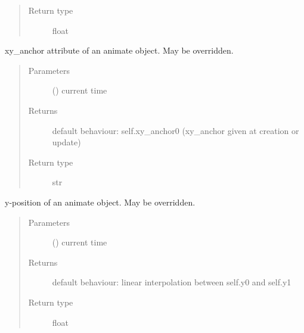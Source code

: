 \documentclass[letterpaper,10pt,english]{sphinxmanual}
\begin{document}
\begin{fulllineitems}
\begin{fulllineitems}
\begin{quote}
\begin{description}
\item[{Return type}] \leavevmode
float

\end{description}\end{quote}

\end{fulllineitems}


\begin{fulllineitems}
\label{\detokenize{Reference:salabim.Animate.xy_anchor}}
xy\_anchor attribute of an animate object. May be overridden.
\begin{quote}\begin{description}
\item[{Parameters}] \leavevmode
{} () \textendash{} current time

\item[{Returns}] \leavevmode
{} \textendash{} default behaviour: self.xy\_anchor0 (xy\_anchor given at creation or update)

\item[{Return type}] \leavevmode
str

\end{description}\end{quote}

\end{fulllineitems}


\begin{fulllineitems}
\label{\detokenize{Reference:salabim.Animate.y}}
y-position of an animate object. May be overridden.
\begin{quote}\begin{description}
\item[{Parameters}] \leavevmode
{} () \textendash{} current time

\item[{Returns}] \leavevmode
{} \textendash{} default behaviour: linear interpolation between self.y0 and self.y1

\item[{Return type}] \leavevmode
float

\end{description}\end{quote}

\end{fulllineitems}


\end{fulllineitems}
\end{document}
